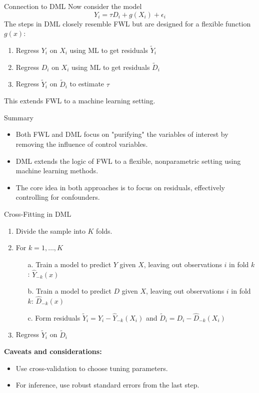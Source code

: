 \documentclass{beamer}
\begin{document}
\begin{frame}{Connection to DML}
  Now consider the model
  \[
    Y_i = \tau D_i + g(X_i) + \epsilon_i
  \]
  The steps in DML closely resemble FWL but are designed for a flexible function \( g(x) \):
  \begin{enumerate}
    \item Regress \( Y_i \) on \( X_i \) using ML to get residuals \( \tilde{Y}_i \)
    \item Regress \( D_i \) on \( X_i \) using ML to get residuals \( \tilde{D}_i \)
    \item Regress \( \tilde{Y}_i \) on \( \tilde{D}_i \) to estimate \( \tau \)
  \end{enumerate}
  This extends FWL to a machine learning setting.
\end{frame}

\begin{frame}{Summary}
  \begin{itemize}
    \item Both FWL and DML focus on "purifying" the variables of interest by removing the influence of control variables.
    \item DML extends the logic of FWL to a flexible, nonparametric setting using machine learning methods.
    \item The core idea in both approaches is to focus on residuals, effectively controlling for confounders.
  \end{itemize}
\end{frame}




\begin{frame}{Cross-Fitting in DML}
  \begin{enumerate}
    \item Divide the sample into \( K \) folds.
    \item For \( k = 1, \ldots, K \)
    \begin{itemize}
      \item[a.] Train a model to predict \( Y \) given \( X \), leaving out observations \( i \) in fold \( k \): \( \hat{Y}_{-k}(x) \)
      \item[b.] Train a model to predict \( D \) given \( X \), leaving out observations \( i \) in fold \( k \): \( \hat{D}_{-k}(x) \)
      \item[c.] Form residuals \( \tilde{Y}_i = Y_i - \hat{Y}_{-k}(X_i) \) and \( \tilde{D}_i = D_i - \hat{D}_{-k}(X_i) \)
    \end{itemize}
    \item Regress \( \tilde{Y}_i \) on \( \tilde{D}_i \)
  \end{enumerate}
  \textbf{Caveats and considerations:}
  \begin{itemize}
    \item Use cross-validation to choose tuning parameters.
    \item For inference, use robust standard errors from the last step.
  \end{itemize}
\end{frame}
\end{document}
